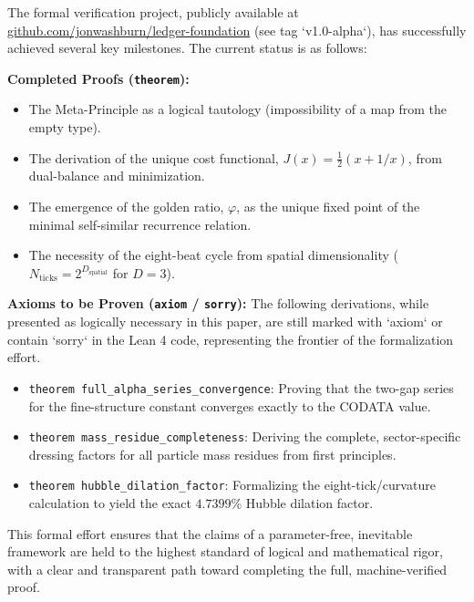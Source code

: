 \documentclass[11pt,a4paper]{article}
\begin{document}
The formal verification project, publicly available at \href{https://github.com/jonwashburn/ledger-foundation}{github.com/jonwashburn/ledger-foundation} (see tag `v1.0-alpha`), has successfully achieved several key milestones. The current status is as follows:

\textbf{Completed Proofs (\texttt{theorem}):}
\begin{itemize}
    \item The Meta-Principle as a logical tautology (impossibility of a map from the empty type).
    \item The derivation of the unique cost functional, \(J(x) = \frac{1}{2}(x + 1/x)\), from dual-balance and minimization.
    \item The emergence of the golden ratio, \(\varphi\), as the unique fixed point of the minimal self-similar recurrence relation.
    \item The necessity of the eight-beat cycle from spatial dimensionality (\(N_{\text{ticks}} = 2^{D_{\text{spatial}}}\) for \(D=3\)).
\end{itemize}

\textbf{Axioms to be Proven (\texttt{axiom} / \texttt{sorry}):}
The following derivations, while presented as logically necessary in this paper, are still marked with `axiom` or contain `sorry` in the Lean 4 code, representing the frontier of the formalization effort.
\begin{itemize}
    \item \texttt{theorem full\_alpha\_series\_convergence}: Proving that the two-gap series for the fine-structure constant converges exactly to the CODATA value.
    \item \texttt{theorem mass\_residue\_completeness}: Deriving the complete, sector-specific dressing factors for all particle mass residues from first principles.
    \item \texttt{theorem hubble\_dilation\_factor}: Formalizing the eight-tick/curvature calculation to yield the exact \(4.7399\%\) Hubble dilation factor.
\end{itemize}

This formal effort ensures that the claims of a parameter-free, inevitable framework are held to the highest standard of logical and mathematical rigor, with a clear and transparent path toward completing the full, machine-verified proof.
\end{document}
